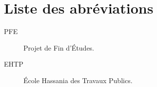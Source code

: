 \newpage
\begingroup
\renewcommand{\addcontentsline}[3]{}
\setcounter{tocdepth}{1}
\tableofcontents
\endgroup

\newpage
\begingroup
\renewcommand{\addcontentsline}[3]{}
\listoffigures
\endgroup

\newpage
\begingroup
\renewcommand{\addcontentsline}[3]{}
\listoftables
\endgroup

\newpage
\chapter*{Liste des abréviations}
\addcontentsline{toc}{chapter}{Liste des abréviations}
\begin{description}
  \item[PFE] Projet de Fin d'Études.
  \item[EHTP] École Hassania des Travaux Publics.
\end{description}
